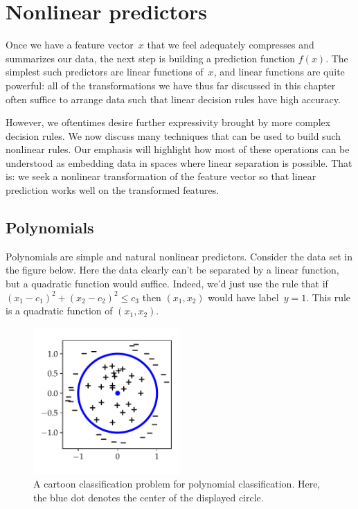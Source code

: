 \documentclass{tufte-book}
\begin{document}
\hypertarget{nonlinear-predictors}{%
\section{Nonlinear predictors}\label{nonlinear-predictors}}

Once we have a feature vector~\(x\) that we feel adequately compresses
and summarizes our data, the next step is building a prediction function
\(f(x)\). The simplest such predictors are linear functions of~\(x\),
and linear functions are quite powerful: all of the transformations we
have thus far discussed in this chapter often suffice to arrange data
such that linear decision rules have high accuracy.

However, we oftentimes desire further expressivity brought by more
complex decision rules. We now discuss many techniques that can be used
to build such nonlinear rules. Our emphasis will highlight how most of
these operations can be understood as embedding data in spaces where
linear separation is possible. That is: we seek a nonlinear
transformation of the feature vector so that linear prediction works
well on the transformed features.

\hypertarget{polynomials}{%
\subsection{Polynomials}\label{polynomials}}


Polynomials are simple and natural nonlinear predictors. Consider the
data set in the figure below. Here the data clearly can't be separated
by a linear function, but a quadratic function would suffice. Indeed,
we'd just use the rule that if~\((x_1-c_1)^2+(x_2-c_2)^2 \leq c_3\) then
\((x_1,x_2)\) would have label~\(y=1\). This rule is a quadratic
function of \((x_1,x_2)\).

\begin{figure}
\centering
\includegraphics[width=0.5\textwidth,height=\textheight]{assets/poly_classification_cartoon}
\caption{A cartoon classification problem for polynomial classification.
Here, the blue dot denotes the center of the displayed circle.}
\end{figure}
\end{document}
